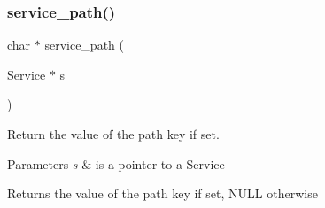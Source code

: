 \subsubsection{\texorpdfstring{service\+\_\+path()}{service\_path()}}
{\footnotesize\ttfamily char $\ast$ service\+\_\+path (\begin{DoxyParamCaption}\item[{Service $\ast$}]{s }\end{DoxyParamCaption})}



Return the value of the \textquotesingle{}path\textquotesingle{} key if set. 


\begin{DoxyParams}{Parameters}
{\em s} & is a pointer to a Service \\
\hline
\end{DoxyParams}
\begin{DoxyReturn}{Returns}
the value of the \textquotesingle{}path\textquotesingle{} key if set, N\+U\+LL otherwise 
\end{DoxyReturn}
